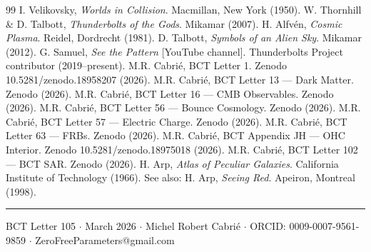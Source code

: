 \documentclass[twocolumn,10pt]{article}
\begin{document}
\begin{thebibliography}{99}
 I. Velikovsky, \textit{Worlds in Collision}.
    Macmillan, New York (1950).
 W. Thornhill \& D. Talbott,
    \textit{Thunderbolts of the Gods}. Mikamar (2007).
 H. Alfv\'{e}n, \textit{Cosmic Plasma}.
    Reidel, Dordrecht (1981).
 D. Talbott,
    \textit{Symbols of an Alien Sky}. Mikamar (2012).
 G. Samuel, \textit{See the Pattern} [YouTube channel].
    Thunderbolts Project contributor (2019--present).
 M.R. Cabri\'{e}, BCT Letter 1.
    Zenodo 10.5281/zenodo.18958207 (2026).
 M.R. Cabri\'{e}, BCT Letter 13 --- Dark Matter.
    Zenodo (2026).
 M.R. Cabri\'{e}, BCT Letter 16 --- CMB Observables.
    Zenodo (2026).
 M.R. Cabri\'{e}, BCT Letter 56 --- Bounce Cosmology.
    Zenodo (2026).
 M.R. Cabri\'{e}, BCT Letter 57 --- Electric Charge.
    Zenodo (2026).
 M.R. Cabri\'{e}, BCT Letter 63 --- FRBs.
    Zenodo (2026).
 M.R. Cabri\'{e}, BCT Appendix JH --- OHC Interior.
    Zenodo 10.5281/zenodo.18975018 (2026).
 M.R. Cabri\'{e}, BCT Letter 102 --- BCT SAR.
    Zenodo (2026).
 H. Arp, \textit{Atlas of Peculiar Galaxies}.
    California Institute of Technology (1966).
    See also: H. Arp, \textit{Seeing Red}. Apeiron, Montreal (1998).
\end{thebibliography}

\vspace{8pt}\noindent\rule{\linewidth}{0.4pt}
\small BCT Letter 105 $\cdot$ March 2026 $\cdot$ Michel Robert Cabri\'{e}
$\cdot$ ORCID: 0009-0007-9561-9859 $\cdot$ ZeroFreeParameters@gmail.com
\end{document}

